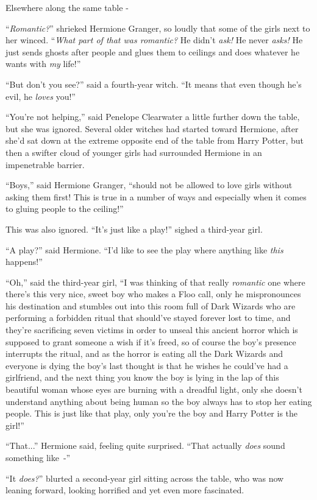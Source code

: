 Elsewhere along the same table -

``\emph{Romantic?}'' shrieked Hermione Granger, so loudly that some of the girls next to her winced. ``\emph{What part of that was romantic?} He didn't \emph{ask!} He never \emph{asks!} He just sends ghosts after people and glues them to ceilings and does whatever he wants with \emph{my} life!''

``But don't you see?'' said a fourth-year witch. ``It means that even though he's evil, he \emph{loves} you!''

``You're not helping,'' said Penelope Clearwater a little further down the table, but she was ignored. Several older witches had started toward Hermione, after she'd sat down at the extreme opposite end of the table from Harry Potter, but then a swifter cloud of younger girls had surrounded Hermione in an impenetrable barrier.

``Boys,'' said Hermione Granger, ``should not be allowed to love girls without asking them first! This is true in a number of ways and especially when it comes to gluing people to the ceiling!''

This was also ignored. ``It's just like a play!'' sighed a third-year girl.

``A play?'' said Hermione. ``I'd like to see the play where anything like \emph{this} happens!''

``Oh,'' said the third-year girl, ``I was thinking of that really \emph{romantic} one where there's this very nice, sweet boy who makes a Floo call, only he mispronounces his destination and stumbles out into this room full of Dark Wizards who are performing a forbidden ritual that should've stayed forever lost to time, and they're sacrificing seven victims in order to unseal this ancient horror which is supposed to grant someone a wish if it's freed, so of course the boy's presence interrupts the ritual, and as the horror is eating all the Dark Wizards and everyone is dying the boy's last thought is that he wishes he could've had a girlfriend, and the next thing you know the boy is lying in the lap of this beautiful woman whose eyes are burning with a dreadful light, only she doesn't understand anything about being human so the boy always has to stop her eating people. This is just like that play, only you're the boy and Harry Potter is the girl!''

``That...'' Hermione said, feeling quite surprised. ``That actually \emph{does} sound something like~-''

``It \emph{does?}'' blurted a second-year girl sitting across the table, who was now leaning forward, looking horrified and yet even more fascinated.

